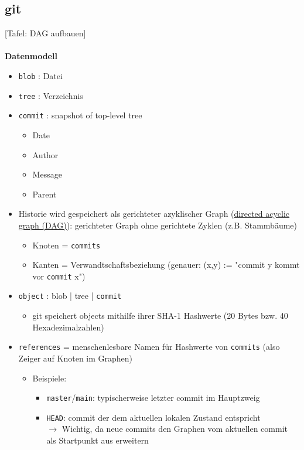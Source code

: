 \subsection{git}
[Tafel: DAG aufbauen]\\~\\
\textbf{Datenmodell}\\
\begin{itemize}
	\item \texttt{blob} : Datei
	\item \texttt{tree} : Verzeichnis
	\item \texttt{commit} : snapshot of top-level tree
	\begin{itemize}
		\item Date
		\item Author
		\item Message
		\item Parent
	\end{itemize}
	\item Historie wird gespeichert als gerichteter azyklischer Graph (\href{https://en.wikipedia.org/wiki/Directed_acyclic_graph}{directed acyclic graph (DAG)}): gerichteter Graph ohne gerichtete Zyklen (z.B. Stammbäume)
	\begin{itemize}
		\item Knoten = \texttt{commits}
		\item Kanten = Verwandtschaftsbeziehung (genauer: (x,y) := "commit y kommt vor \texttt{commit} x")
	\end{itemize}
	\item \texttt{object} : blob | tree | \texttt{commit}
	\begin{itemize}
		\item git speichert objects mithilfe ihrer SHA-1 Hashwerte (20 Bytes bzw. 40 Hexadezimalzahlen)
	\end{itemize}
	\item \texttt{references} = menschenlesbare Namen für Hashwerte von \texttt{commits} (also Zeiger auf Knoten im Graphen)
	\begin{itemize}
		\item Beispiele:
			\begin{itemize}
			\item  \texttt{master}/\texttt{main}: typischerweise letzter commit im Hauptzweig
			\item \texttt{HEAD}: commit der dem aktuellen lokalen Zustand entspricht\\
			$\rightarrow$ Wichtig, da neue commits den Graphen vom aktuellen commit als Startpunkt aus erweitern\\

\end{itemize}
\end{itemize}
\end{itemize}
